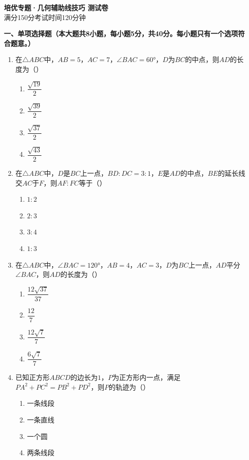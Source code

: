 \documentclass[12pt, a4paper]{ctexart}
\begin{document}
\begin{center}
{\Large\bfseries 培优专题·几何辅助线技巧 测试卷}\\[0.5em]
{\normalsize 满分150分\quad 考试时间120分钟}
\end{center}

\vspace{0.5em}

\noindent\textbf{一、单项选择题（本大题共8小题，每小题5分，共40分。每小题只有一个选项符合题意。）}

\begin{enumerate}[label=\Alph*.]

\item 在$\triangle ABC$中，$AB=5$，$AC=7$，$\angle BAC=60°$，$D$为$BC$的中点，则$AD$的长度为（\quad）
\begin{enumerate}[label=]
\item $\dfrac{\sqrt{19}}{2}$ \qquad \item $\dfrac{\sqrt{39}}{2}$ \qquad \item $\dfrac{\sqrt{37}}{2}$ \qquad \item $\dfrac{\sqrt{43}}{2}$
\end{enumerate}

\item 在$\triangle ABC$中，$D$是$BC$上一点，$BD:DC=3:1$，$E$是$AD$的中点，$BE$的延长线交$AC$于$F$，则$AF:FC$等于（\quad）
\begin{enumerate}[label=]
\item $1:2$ \qquad \item $2:3$ \qquad \item $3:4$ \qquad \item $1:3$
\end{enumerate}

\item 在$\triangle ABC$中，$\angle BAC=120°$，$AB=4$，$AC=3$，$D$为$BC$上一点，$AD$平分$\angle BAC$，则$AD$的长度为（\quad）
\begin{enumerate}[label=]
\item $\dfrac{12\sqrt{37}}{37}$ \qquad \item $\dfrac{12}{7}$ \qquad \item $\dfrac{12\sqrt{7}}{7}$ \qquad \item $\dfrac{6\sqrt{7}}{7}$
\end{enumerate}

\item 已知正方形$ABCD$的边长为$1$，$P$为正方形内一点，满足$PA^2+PC^2=PB^2+PD^2$，则$P$的轨迹为（\quad）
\begin{enumerate}[label=]
\item 一条线段 \qquad \item 一条直线 \qquad \item 一个圆 \qquad \item 两条线段
\end{enumerate}


\end{enumerate}
\end{document}
